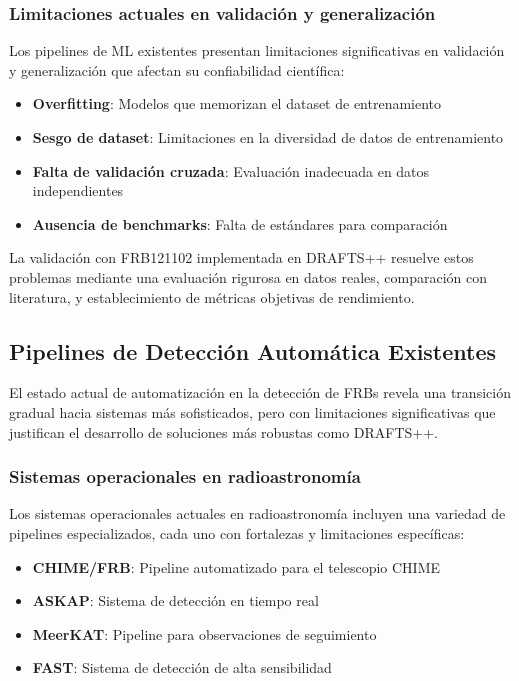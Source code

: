\subsubsection{Limitaciones actuales en validación y generalización}

Los pipelines de ML existentes presentan limitaciones significativas en validación y generalización que afectan su confiabilidad científica:

\begin{itemize}
    \item \textbf{Overfitting}: Modelos que memorizan el dataset de entrenamiento
    \item \textbf{Sesgo de dataset}: Limitaciones en la diversidad de datos de entrenamiento
    \item \textbf{Falta de validación cruzada}: Evaluación inadecuada en datos independientes
    \item \textbf{Ausencia de benchmarks}: Falta de estándares para comparación
\end{itemize}

La validación con FRB121102 implementada en DRAFTS++ resuelve estos problemas mediante una evaluación rigurosa en datos reales, comparación con literatura, y establecimiento de métricas objetivas de rendimiento.

\subsection{Pipelines de Detección Automática Existentes}

El estado actual de automatización en la detección de FRBs revela una transición gradual hacia sistemas más sofisticados, pero con limitaciones significativas que justifican el desarrollo de soluciones más robustas como DRAFTS++.

\subsubsection{Sistemas operacionales en radioastronomía}

Los sistemas operacionales actuales en radioastronomía incluyen una variedad de pipelines especializados, cada uno con fortalezas y limitaciones específicas:

\begin{itemize}
    \item \textbf{CHIME/FRB}: Pipeline automatizado para el telescopio CHIME
    \item \textbf{ASKAP}: Sistema de detección en tiempo real
    \item \textbf{MeerKAT}: Pipeline para observaciones de seguimiento
    \item \textbf{FAST}: Sistema de detección de alta sensibilidad
\end{itemize}

